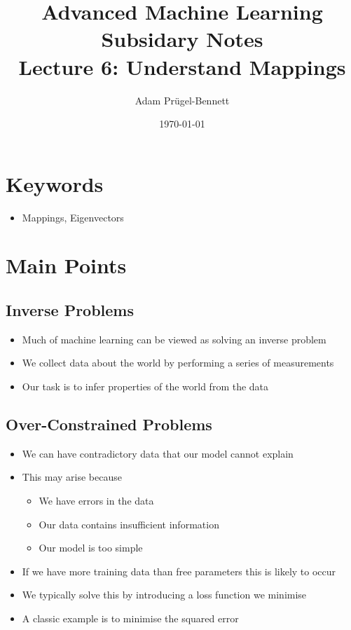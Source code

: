 \documentclass[11pt]{article}
\author{Adam Prügel-Bennett}
\date{\today}
\title{Advanced Machine Learning Subsidary Notes\\\medskip
\large Lecture 6: Understand Mappings}
\begin{document}
\maketitle


\section{Keywords}
\label{sec:orge85108c}
\begin{itemize}
\item Mappings, Eigenvectors
\end{itemize}

\section{Main Points}
\label{sec:org924f958}

\subsection{Inverse Problems}
\label{sec:orgc88328f}
\begin{itemize}
\item Much of machine learning can be viewed as solving an inverse problem
\item We collect data about the world by performing a series of measurements
\item Our task is to infer properties of the world from the data
\end{itemize}

\subsection{Over-Constrained Problems}
\label{sec:org197f347}
\begin{itemize}
\item We can have contradictory data that our model cannot explain
\item This may arise because
\begin{itemize}
\item We have errors in the data
\item Our data contains insufficient information
\item Our model is too simple
\end{itemize}
\item If we have more training data than free parameters this is likely to occur
\item We typically solve this by introducing a loss function we minimise
\item A classic example is to minimise the squared error
\end{itemize}
\end{document}
